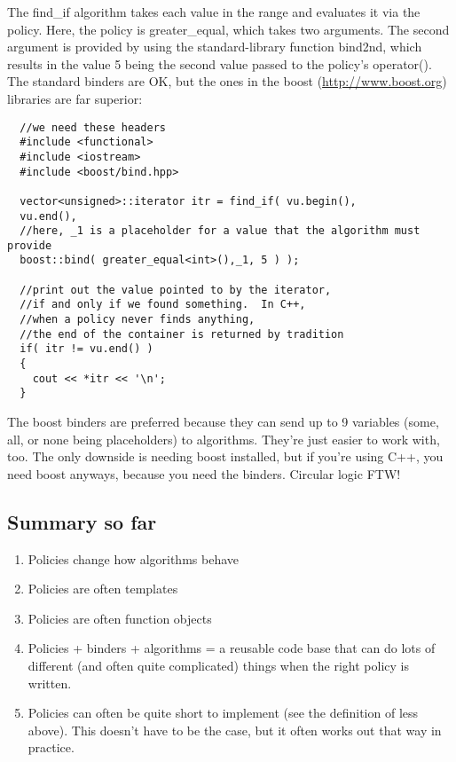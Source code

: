 \documentclass{article}
\begin{document}
The find\_if algorithm takes each value in the range and evaluates it via the policy.  Here, the policy is greater\_equal, which takes two arguments.  The second argument is provided by using the standard-library function bind2nd, which results in the value 5 being the second value passed to the policy's operator().  The standard binders are OK, but the ones in the boost (\url{http://www.boost.org}) libraries are far superior:

\begin{lstlisting}
  //we need these headers
  #include <functional>
  #include <iostream>
  #include <boost/bind.hpp>

  vector<unsigned>::iterator itr = find_if( vu.begin(), 
  vu.end(), 
  //here, _1 is a placeholder for a value that the algorithm must provide
  boost::bind( greater_equal<int>(),_1, 5 ) );

  //print out the value pointed to by the iterator, 
  //if and only if we found something.  In C++,
  //when a policy never finds anything, 
  //the end of the container is returned by tradition
  if( itr != vu.end() )
  {
    cout << *itr << '\n';
  }
\end{lstlisting}

The boost binders are preferred because they can send up to 9 variables (some, all, or none being placeholders) to algorithms.  They're just easier to work with, too.  The only downside is needing boost installed, but if you're using C++, you need boost anyways, because you need the binders.  Circular logic FTW!

\subsection{Summary so far}
\begin{enumerate}
\item Policies change how algorithms behave
\item Policies are often templates
\item Policies are often function objects
\item Policies + binders + algorithms = a reusable code base that can do lots of different (and often quite complicated) things when the right policy is written.
\item Policies can often be quite short to implement (see the definition of less above).  This doesn't have to be the case, but it often works out that way in practice.
\end{enumerate}
\end{document}
